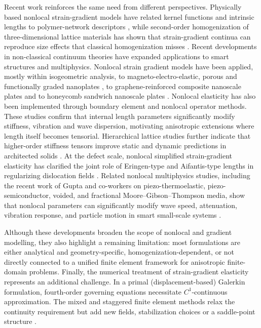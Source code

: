 \documentclass[final,3p,times,fleqn]{elsarticle}
\newcommand{\revtwo}[1]{\textcolor{revtwocolor}{#1}}
\begin{document}
Recent work reinforces the same need from different perspectives. Physically based nonlocal strain-gradient models have related kernel functions and intrinsic lengths to polymer-network descriptors \cite{Jiang2023}, while second-order homogenization of three-dimensional lattice materials has shown that strain-gradient continua can reproduce size effects that classical homogenization misses \cite{Molavitabrizi2023}.
Recent developments in non-classical continuum theories have expanded applications to smart structures and multiphysics. \revtwo{Nonlocal strain gradient models have been applied, mostly within isogeometric analysis, to magneto-electro-elastic, porous and functionally graded nanoplates \cite{PhungVan2024AMM128,PhungVan2024AMM127,PhungVan2024CS335,Thai2023CS316}, to graphene-reinforced composite nanoscale plates \cite{PhungVan2023EC39} and to honeycomb sandwich nanoscale plates \cite{PhungVan2024TWS198}. Nonlocal elasticity has also been implemented through boundary element \cite{Schwartz2012EABE36} and nonlocal operator \cite{ZhangRen2023EWC39} methods. }These studies confirm that internal length parameters significantly modify stiffness, vibration and wave dispersion, motivating anisotropic extensions where length itself becomes tensorial. Hierarchical lattice studies further indicate that higher-order stiffness tensors improve static and dynamic predictions in architected solids \cite{YangLiuXia2024}. At the defect scale, nonlocal simplified strain-gradient elasticity has clarified the joint role of Eringen-type and Aifantis-type lengths in regularizing dislocation fields \cite{Lazar2024}. Related nonlocal multiphysics studies, including the recent work of Gupta and co-workers on piezo-thermoelastic, piezo-semiconductor, voided, and fractional Moore--Gibson--Thompson media, show that nonlocal parameters can significantly modify wave speed, attenuation, vibration response, and particle motion in smart small-scale systems \cite{Gupta2024Impact,Gupta2024Vibrational,Gupta2024Rayleigh,Gupta2025Piezo}.


Although these developments broaden the scope of nonlocal and gradient modelling, they also highlight a remaining limitation: most formulations are either analytical and geometry-specific, homogenization-dependent, or not directly connected to a unified finite element framework for anisotropic finite-domain problems. Finally, the numerical treatment of strain-gradient elasticity represents an additional challenge. In a primal (displacement-based) Galerkin formulation, fourth-order governing equations necessitate $C^{1}$-continuous approximation. The mixed and staggered finite element methods relax the continuity requirement but add new fields, stabilization choices or a saddle-point structure \cite{AmanatidouAravas2002,AskesMorataAifantis2008,PhunpengBaiz2015}.
\end{document}
